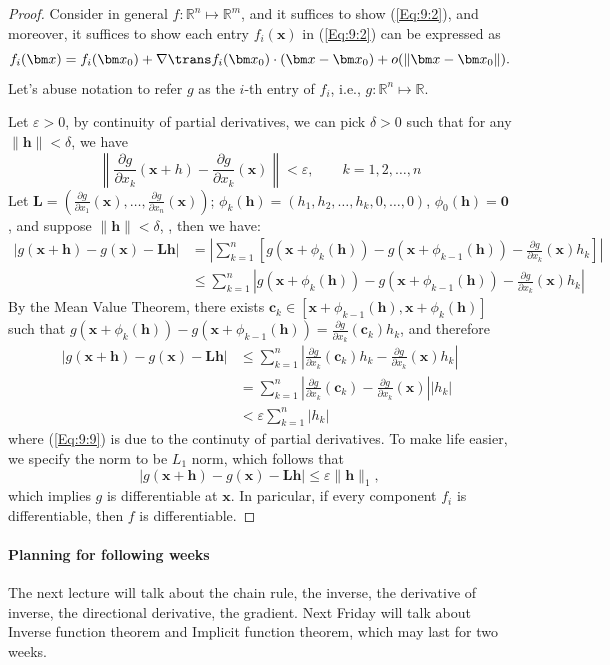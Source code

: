 \begin{proof}
Consider in general $f:\mathbb{R}^n\mapsto\mathbb{R}^m$, and it suffices to show (\ref{Eq:9:2}), and moreover, it suffices to show each entry $f_i(\bm x)$ in (\ref{Eq:9:2}) can be expressed as
\[
f_i(\bm x)=f_i(\bm x_0)+\nabla\trans f_i(\bm x_0)\cdot (\bm x-\bm x_0)+o(\|\bm x-\bm x_0\|).
\]
Let's abuse notation to refer $g$ as the $i$-th entry of $f_i$, i.e., $g:\mathbb{R}^n\mapsto\mathbb{R}$.

Let $\varepsilon>0$, by continuity of partial derivatives, we can pick $\delta>0$ such that for any $\|\bm h\|<\delta$, we have
\begin{equation}
\left\|\frac{\partial g}{\partial x_k}(\bm x+h) - \frac{\partial g}{\partial x_k}(\bm x) \right\|<\varepsilon,\qquad k=1,2,\dots,n
\end{equation}
Let $\bm L=(\frac{\partial g}{\partial x_1}(\bm x),\dots,\frac{\partial g}{\partial x_n}(\bm x))$; $\phi_k(\bm h)=(h_1,h_2,\dots,h_k,0,\dots,0)$, $\phi_0(\bm h)=\bm0$, and suppose $\|\bm h\|<\delta$,
, then we have:
\begin{align}
|g(\bm x+\bm h) - g(\bm x) - \bm L\bm h| &=\left|\sum_{k=1}^n[g(\bm x+\phi_k(\bm h)) - g(\bm x+\phi_{k-1}(\bm h)) - \frac{\partial g}{\partial x_k}(\bm x)h_k]\right|\\
&\le\sum_{k=1}^n\left|g(\bm x+\phi_k(\bm h)) - g(\bm x+\phi_{k-1}(\bm h)) - \frac{\partial g}{\partial x_k}(\bm x)h_k\right|
\end{align}
By the Mean Value Theorem, there exists $\bm c_k\in[\bm x+\phi_{k-1}(\bm h),\bm x+\phi_k(\bm h)]$ such that $g(\bm x+\phi_k(\bm h)) - g(\bm x+\phi_{k-1}(\bm h))=\frac{\partial g}{\partial x_k}(\bm c_k)h_k$, and therefore
\begin{align}
|g(\bm x+\bm h) - g(\bm x) - \bm L\bm h|&\le
\sum_{k=1}^n\left|\frac{\partial g}{\partial x_k}(\bm c_k)h_k - \frac{\partial g}{\partial x_k}(\bm x)h_k\right|\\
&=\sum_{k=1}^n\left|\frac{\partial g}{\partial x_k}(\bm c_k) - \frac{\partial g}{\partial x_k}(\bm x)\right||h_k|\\
&<\varepsilon\sum_{k=1}^n|h_k|\label{Eq:9:9}
\end{align}
where (\ref{Eq:9:9}) is due to the continuty of partial derivatives. To make life easier, we specify the norm to be $L_1$ norm, which follows that
\[
|g(\bm x+\bm h) - g(\bm x) - \bm L\bm h|\le\varepsilon\|\bm h\|_1,
\]
which implies $g$ is differentiable at $\bm x$. In paricular, if every component $f_i$ is differentiable, then $f$ is differentiable.

\end{proof}

\paragraph{Planning for following weeks}

The next lecture will talk about the chain rule, the inverse, the derivative of inverse, the directional derivative, the gradient. Next Friday will talk about Inverse function theorem and Implicit function theorem, which may last for two weeks.
